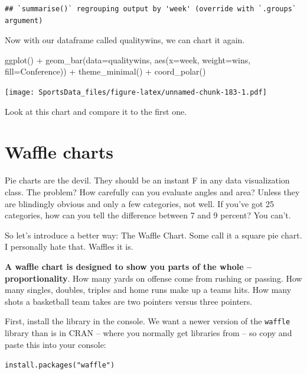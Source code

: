 \documentclass[
]{book}
\newenvironment{Shaded}{\begin{snugshade}}{\end{snugshade}}
\newcommand{\AttributeTok}[1]{\textcolor[rgb]{0.77,0.63,0.00}{#1}}
\newcommand{\FunctionTok}[1]{\textcolor[rgb]{0.00,0.00,0.00}{#1}}
\newcommand{\NormalTok}[1]{#1}
\newcommand{\SpecialCharTok}[1]{\textcolor[rgb]{0.00,0.00,0.00}{#1}}
\begin{document}
\begin{verbatim}
## `summarise()` regrouping output by 'week' (override with `.groups` argument)
\end{verbatim}

Now with our dataframe called qualitywins, we can chart it again.

\begin{Shaded}
\begin{Highlighting}[]
\FunctionTok{ggplot}\NormalTok{() }\SpecialCharTok{+} \FunctionTok{geom\_bar}\NormalTok{(}\AttributeTok{data=}\NormalTok{qualitywins, }\FunctionTok{aes}\NormalTok{(}\AttributeTok{x=}\NormalTok{week, }\AttributeTok{weight=}\NormalTok{wins, }\AttributeTok{fill=}\NormalTok{Conference)) }\SpecialCharTok{+} \FunctionTok{theme\_minimal}\NormalTok{() }\SpecialCharTok{+} \FunctionTok{coord\_polar}\NormalTok{()}
\end{Highlighting}
\end{Shaded}

\texttt{[image: SportsData\_files/figure-latex/unnamed-chunk-183-1.pdf]}

Look at this chart and compare it to the first one.

\hypertarget{waffle-charts}{%
\chapter{Waffle charts}\label{waffle-charts}}

Pie charts are the devil. They should be an instant F in any data visualization class. The problem? How carefully can you evaluate angles and area? Unless they are blindingly obvious and only a few categories, not well. If you've got 25 categories, how can you tell the difference between 7 and 9 percent? You can't.

So let's introduce a better way: The Waffle Chart. Some call it a square pie chart. I personally hate that. Waffles it is.

\textbf{A waffle chart is designed to show you parts of the whole -- proportionality}. How many yards on offense come from rushing or passing. How many singles, doubles, triples and home runs make up a teams hits. How many shots a basketball team takes are two pointers versus three pointers.

First, install the library in the console. We want a newer version of the \texttt{waffle} library than is in CRAN -- where you normally get libraries from -- so copy and paste this into your console:

\texttt{install.packages("waffle")}
\end{document}
